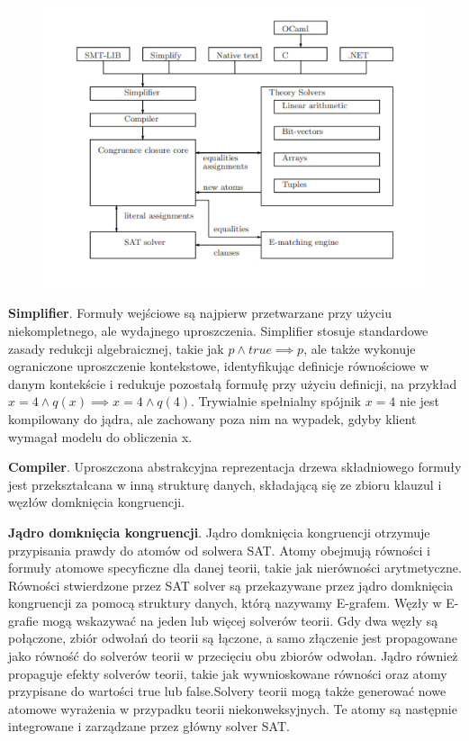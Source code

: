 	\begin{figure}
		\centering
		\includegraphics[width=0.7\linewidth]{screenshot001}
		\caption{}
		\label{fig:screenshot001}
	\end{figure}

\textbf{Simplifier}. Formuły wejściowe są najpierw przetwarzane przy użyciu niekompletnego, ale wydajnego uproszczenia. Simplifier stosuje standardowe zasady redukcji algebraicznej, takie jak $p \land true \implies p$, ale także wykonuje ograniczone uproszczenie kontekstowe, identyfikując definicje równościowe w danym kontekście i redukuje pozostałą formułę przy użyciu definicji, na przykład $x = 4 \land q(x) \implies x = 4 \land q(4)$. Trywialnie spełnialny spójnik $x = 4$ nie jest kompilowany do jądra, ale zachowany poza nim na wypadek, gdyby klient wymagał modelu do obliczenia x.

\textbf{Compiler}. Uproszczona abstrakcyjna reprezentacja drzewa składniowego formuły jest przekształcana w inną strukturę danych, składającą się ze zbioru klauzul i węzłów domknięcia kongruencji.

\textbf{Jądro domknięcia kongruencji}. Jądro domknięcia kongruencji otrzymuje przypisania prawdy do atomów od solwera SAT. Atomy obejmują równości i formuły atomowe specyficzne dla danej teorii, takie jak nierówności arytmetyczne. Równości stwierdzone przez SAT solver są przekazywane przez jądro domknięcia kongruencji za pomocą struktury danych, którą nazywamy E-grafem. Węzły w E-grafie mogą wskazywać na jeden lub więcej solverów teorii. Gdy dwa węzły są połączone, zbiór odwołań do teorii są łączone, a samo złączenie jest propagowane jako równość do solverów teorii w przecięciu obu zbiorów odwołan. Jądro również propaguje efekty solverów teorii, takie jak wywnioskowane równości oraz atomy przypisane do wartości true lub false.Solvery teorii mogą także generować nowe atomowe wyrażenia w przypadku teorii niekonweksyjnych. Te atomy są następnie integrowane i zarządzane przez główny solver SAT.

